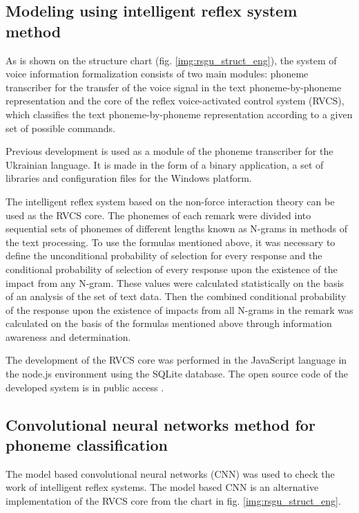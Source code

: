 \documentclass[review,authoryear]{elsarticle}
\begin{document}
\subsection{Modeling using intelligent reflex system method}

As is shown on the structure chart (fig. \ref{img:rsgu_struct_eng}), the system of voice information formalization consists of two main modules: phoneme transcriber for the transfer of the voice signal in the text phoneme-by-phoneme representation and the core of the reflex voice-activated control system  (RVCS), which classifies the text phoneme-by-phoneme representation according to a given set of possible commands. 

Previous development is used \citep{eng_Pylypenko_2008} as a module of the phoneme transcriber for the Ukrainian language. It is made in the form of a binary application, a set of libraries and configuration files for the Windows platform. 

The intelligent reflex system based on the non-force interaction theory can be used as the RVCS core. The phonemes of each remark were divided into sequential sets of phonemes of different lengths known as N-grams in methods of the text processing. To use the formulas mentioned above, it was necessary to define the unconditional probability of selection for every response and the conditional probability of selection of every response upon the existence of the impact from any N-gram. These values were calculated statistically on the basis of an analysis of the set of text data. Then the combined conditional probability of the response upon the existence of impacts from all N-grams in the remark was calculated on the basis of the formulas mentioned above through information awareness and determination. 

The development of the RVCS core was performed in the JavaScript language in the node.js environment using the SQLite database. The open source code of the developed system is in public access \citep{code1}. 

\subsection{Convolutional neural networks method for phoneme classification} 

The model based convolutional neural networks (CNN) was used to check the work of intelligent reflex systems. The model based CNN is an alternative implementation of the RVCS core from the chart in fig. \ref{img:rsgu_struct_eng}. 
\end{document}
